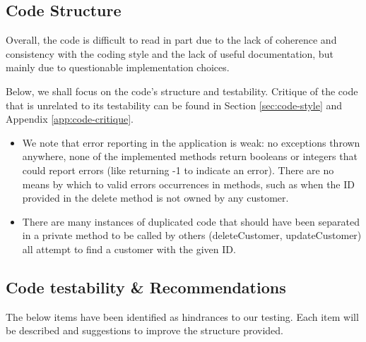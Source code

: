 


\subsection{Code Structure} 
\label{sec:code-structure}
Overall, the code is difficult to read in part due to the lack of coherence and consistency with the coding style and the lack of useful documentation, but mainly due to questionable implementation choices. 

Below, we shall focus on the code's structure and testability. Critique of the code that is unrelated to its testability can be found in Section \ref{sec:code-style} and Appendix \ref{app:code-critique}. 

\begin{itemize}
	\item We note that error reporting in the application is weak: no exceptions thrown anywhere, none of the implemented methods return booleans or integers that could report errors (like returning -1 to indicate an error). There are no means by which  to valid errors occurrences in methods, such as when the ID provided in the delete method is not owned by any customer. 
	\item There are many instances of duplicated code that should have been separated in a private method to be called by others (deleteCustomer, updateCustomer) all attempt to find a customer with the given ID. 
\end{itemize}


\subsection{Code testability \& Recommendations}
The below items have been identified as hindrances to our testing. Each item will be described and suggestions to improve the structure provided. 

